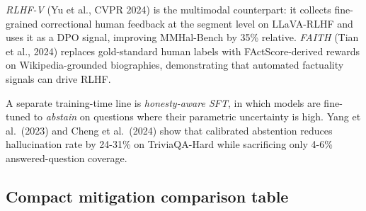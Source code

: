 \documentclass{article}
\begin{document}
\emph{RLHF-V} (Yu et al., CVPR 2024) is the multimodal counterpart: it collects fine-grained correctional human feedback at the segment level on LLaVA-RLHF and uses it as a DPO signal, improving MMHal-Bench by 35\% relative. \emph{FAITH} (Tian et al., 2024) replaces gold-standard human labels with FActScore-derived rewards on Wikipedia-grounded biographies, demonstrating that automated factuality signals can drive RLHF.

A separate training-time line is \emph{honesty-aware SFT}, in which models are fine-tuned to \emph{abstain} on questions where their parametric uncertainty is high. Yang et al.~(2023) and Cheng et al.~(2024) show that calibrated abstention reduces hallucination rate by 24-31\% on TriviaQA-Hard while sacrificing only 4-6\% answered-question coverage.

\subsection{Compact mitigation comparison table}\label{compact-mitigation-comparison-table}
\end{document}
